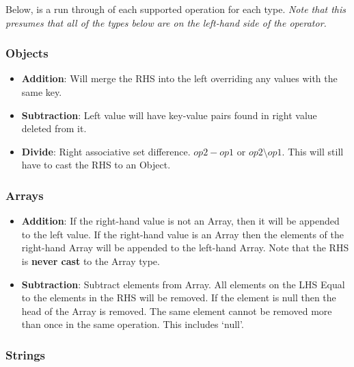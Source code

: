 Below, is a run through of each supported operation for each type. \textit{Note that this presumes that all of the types below are on the left-hand side of the operator.}

\subsubsection{Objects}

\begin{itemize}
    \item \textbf{Addition}: Will merge the RHS into the left overriding any values with the same key.
    \item \textbf{Subtraction}: Left value will have key-value pairs found in right value deleted from it.
    \item \textbf{Divide}: Right associative set difference. $op2 - op1$ or $op2 \setminus op1$. This will still have to cast the RHS to an Object.
\end{itemize}

\subsubsection{Arrays}

\begin{itemize}
    \item \textbf{Addition}: If the right-hand value is not an Array, then it will be appended to the left value. If the right-hand value is an Array then the elements of the right-hand Array will be appended to the left-hand Array. Note that the RHS is \textbf{never cast} to the Array type.
    \item \textbf{Subtraction}: Subtract elements from Array. All elements on the LHS Equal to the elements in the RHS will be removed. If the element is null then the head of the Array is removed. The same element cannot be removed more than once in the same operation. This includes `null'.
\end{itemize}

\subsubsection{Strings}

